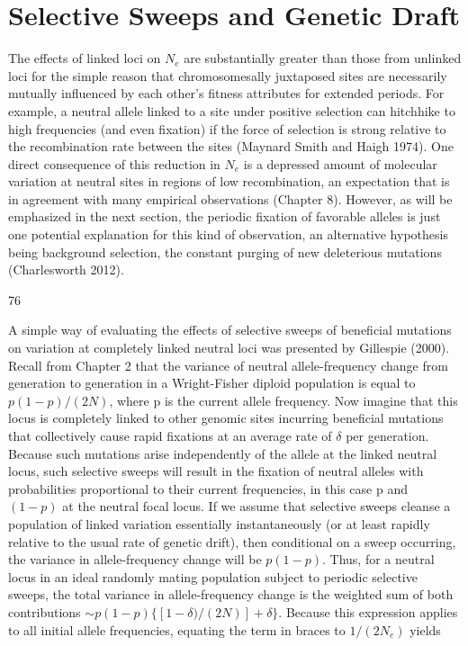 \documentclass{article}
\begin{document}
\section{Selective Sweeps and Genetic Draft}
The effects of linked loci on  $ N_{e} $ are substantially greater than those from unlinked loci for the simple reason that chromosomesally juxtaposed sites are necessarily mutually influenced by each other's fitness attributes for extended periods. For example, a neutral allele linked to a site under positive selection can hitchhike to high frequencies (and even fixation) if the force of selection is strong relative to the recombination rate between the sites (Maynard Smith and Haigh 1974). One direct consequence of this reduction in  $ N_{e} $ is a depressed amount of molecular variation at neutral sites in regions of low recombination, an expectation that is in agreement with many empirical observations (Chapter 8). However, as will be emphasized in the next section, the periodic fixation of favorable alleles is just one potential explanation for this kind of observation, an alternative hypothesis being background selection, the constant purging of new deleterious mutations (Charlesworth 2012).

76

A simple way of evaluating the effects of selective sweeps of beneficial mutations on variation at completely linked neutral loci was presented by Gillespie (2000). Recall from Chapter 2 that the variance of neutral allele-frequency change from generation to generation in a Wright-Fisher diploid population is equal to  $ p(1 - p)/(2N) $, where p is the current allele frequency. Now imagine that this locus is completely linked to other genomic sites incurring beneficial mutations that collectively cause rapid fixations at an average rate of  $ \delta $ per generation. Because such mutations arise independently of the allele at the linked neutral locus, such selective sweeps will result in the fixation of neutral alleles with probabilities proportional to their current frequencies, in this case p and  $ (1 - p) $ at the neutral focal locus. If we assume that selective sweeps cleanse a population of linked variation essentially instantaneously (or at least rapidly relative to the usual rate of genetic drift), then conditional on a sweep occurring, the variance in allele-frequency change will be  $ p(1 - p) $. Thus, for a neutral locus in an ideal randomly mating population subject to periodic selective sweeps, the total variance in allele-frequency change is the weighted sum of both contributions  $ \sim p(1 - p)\{[1 - \delta)/(2N)] + \delta\} $. Because this expression applies to all initial allele frequencies, equating the term in braces to  $ 1/(2N_e) $ yields
\end{document}
